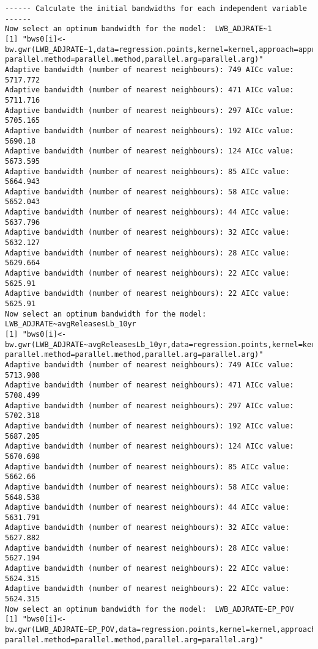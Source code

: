 \documentclass[
  12pt,
]{article}
\begin{document}
\begin{verbatim}
------ Calculate the initial bandwidths for each independent variable ------
Now select an optimum bandwidth for the model:  LWB_ADJRATE~1 
[1] "bws0[i]<-bw.gwr(LWB_ADJRATE~1,data=regression.points,kernel=kernel,approach=approach,adaptive=adaptive,dMat=dMats[[var.dMat.indx[i]]], parallel.method=parallel.method,parallel.arg=parallel.arg)"
Adaptive bandwidth (number of nearest neighbours): 749 AICc value: 5717.772 
Adaptive bandwidth (number of nearest neighbours): 471 AICc value: 5711.716 
Adaptive bandwidth (number of nearest neighbours): 297 AICc value: 5705.165 
Adaptive bandwidth (number of nearest neighbours): 192 AICc value: 5690.18 
Adaptive bandwidth (number of nearest neighbours): 124 AICc value: 5673.595 
Adaptive bandwidth (number of nearest neighbours): 85 AICc value: 5664.943 
Adaptive bandwidth (number of nearest neighbours): 58 AICc value: 5652.043 
Adaptive bandwidth (number of nearest neighbours): 44 AICc value: 5637.796 
Adaptive bandwidth (number of nearest neighbours): 32 AICc value: 5632.127 
Adaptive bandwidth (number of nearest neighbours): 28 AICc value: 5629.664 
Adaptive bandwidth (number of nearest neighbours): 22 AICc value: 5625.91 
Adaptive bandwidth (number of nearest neighbours): 22 AICc value: 5625.91 
Now select an optimum bandwidth for the model:  LWB_ADJRATE~avgReleasesLb_10yr 
[1] "bws0[i]<-bw.gwr(LWB_ADJRATE~avgReleasesLb_10yr,data=regression.points,kernel=kernel,approach=approach,adaptive=adaptive,dMat=dMats[[var.dMat.indx[i]]], parallel.method=parallel.method,parallel.arg=parallel.arg)"
Adaptive bandwidth (number of nearest neighbours): 749 AICc value: 5713.908 
Adaptive bandwidth (number of nearest neighbours): 471 AICc value: 5708.499 
Adaptive bandwidth (number of nearest neighbours): 297 AICc value: 5702.318 
Adaptive bandwidth (number of nearest neighbours): 192 AICc value: 5687.205 
Adaptive bandwidth (number of nearest neighbours): 124 AICc value: 5670.698 
Adaptive bandwidth (number of nearest neighbours): 85 AICc value: 5662.66 
Adaptive bandwidth (number of nearest neighbours): 58 AICc value: 5648.538 
Adaptive bandwidth (number of nearest neighbours): 44 AICc value: 5631.791 
Adaptive bandwidth (number of nearest neighbours): 32 AICc value: 5627.882 
Adaptive bandwidth (number of nearest neighbours): 28 AICc value: 5627.194 
Adaptive bandwidth (number of nearest neighbours): 22 AICc value: 5624.315 
Adaptive bandwidth (number of nearest neighbours): 22 AICc value: 5624.315 
Now select an optimum bandwidth for the model:  LWB_ADJRATE~EP_POV 
[1] "bws0[i]<-bw.gwr(LWB_ADJRATE~EP_POV,data=regression.points,kernel=kernel,approach=approach,adaptive=adaptive,dMat=dMats[[var.dMat.indx[i]]], parallel.method=parallel.method,parallel.arg=parallel.arg)"

\end{verbatim}
\end{document}
